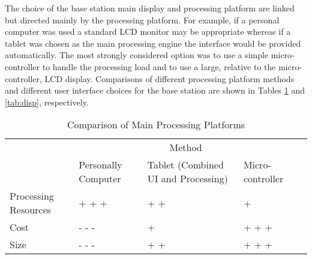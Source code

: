 \documentclass[11pt,letterpaper]{article}
\begin{document}
\newline \quad \newline
The choice of the base station main display and processing platform are linked but directed mainly by the processing platform. For example, if a personal computer was used a standard LCD monitor may be appropriate whereas if a tablet was chosen as the main processing engine the interface would be provided automatically. The most strongly considered option was to use a simple micro-controller to handle the processing load and to use a large, relative to the micro-controller, LCD display. Comparisons of different processing platform methods and different user interface choices for the base station are shown in Tables \ref{tab:proc} and \ref{tab:disp}, respectively.
\begin{table}[h!]
\begin{tabular}{| p{2in} | p{1in} | p{1.5in} | p{1.5in} | p{1.5in} |}
\cline{2-4}
\multicolumn{1}{c}{}&\multicolumn{3}{|c|}{Method} \\
\cline{2-4}
\multicolumn{1}{c|}{}&Personally Computer&Tablet (Combined UI and Processing)&Micro-controller\\
\hline
Processing Resources&+ + + &+ +&+\\
\hline
Cost &- - -& + &+ + +\\
\hline
Size&- - -&+ +&+ + +\\
\hline
\end{tabular}
\caption{Comparison of Main Processing Platforms}
\label{tab:proc}
\end{table}
\end{document}
